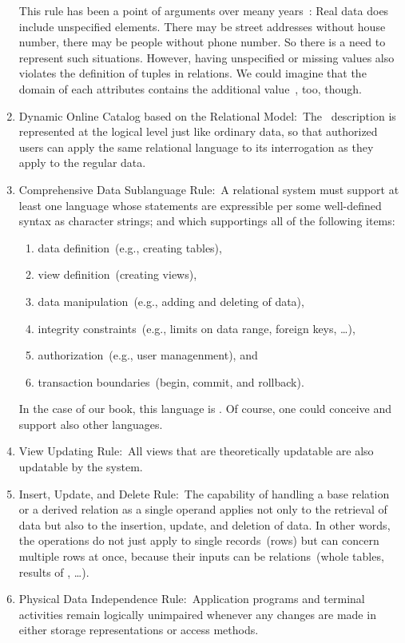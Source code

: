 \begin{enumerate}
This rule has been a point of arguments over meany years~\cite{C20245YOQ}:
Real data does include unspecified elements.
There may be street addresses without house number, there may be people without phone number.
So there is a need to represent such situations.
However, having unspecified or missing values also violates the definition of tuples in relations.
We could imagine that the domain of each attributes contains the additional value~, too, though.%
%
\item Dynamic Online Catalog based on the Relational Model:~The \db\ description is represented at the logical level just like ordinary data, so that authorized users can apply the same relational language to its interrogation as they apply to the regular data.%
%
\item Comprehensive Data Sublanguage Rule:~A relational system must support at least one language whose statements are expressible per some well-defined syntax as character strings; and which supportings all of the following items:%
\begin{enumerate}%
\item data definition~(e.g., creating tables),%
\item view definition~(creating views),%
\item data manipulation~(e.g., adding and deleting of data),%
\item integrity constraints~(e.g., limits on data range, foreign keys, \dots),%
\item authorization~(e.g., user managenment), and%
\item transaction boundaries~(begin, commit, and rollback).%
\end{enumerate}
In the case of our book, this language is \sql.
Of course, one could conceive and support also other languages.%
%
\item View Updating Rule:~All views that are theoretically updatable are also updatable by the system.%
%
\item Insert, Update, and Delete Rule:~The capability of handling a base relation or a derived relation as a single operand applies not only to the retrieval of data but also to the insertion, update, and deletion of data.
In other words, the operations do not just apply to single records~(rows) but can concern multiple rows at once, because their inputs can be relations~(whole tables, results of , \dots).%
%
\item Physical Data Independence Rule:~Application programs and terminal activities remain logically unimpaired whenever any changes are made in either storage representations or access methods.

\end{enumerate}
